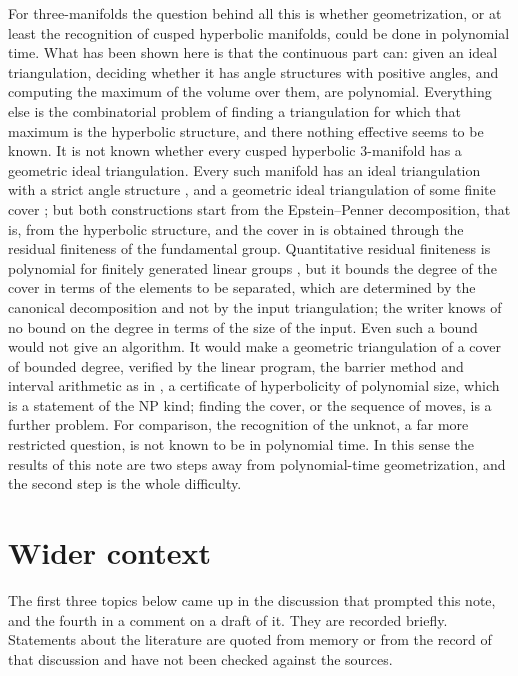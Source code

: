 \documentclass[11pt]{amsart}
\theoremstyle{definition}
\theoremstyle{remark}
\begin{document}
For three-manifolds the question behind all this is whether geometrization, or at least the recognition of cusped hyperbolic manifolds, could be done in polynomial time. What has been shown here is that the continuous part can: given an ideal triangulation, deciding whether it has angle structures with positive angles, and computing the maximum of the volume over them, are polynomial.
Everything else is the combinatorial problem of finding a triangulation for which that maximum is the hyperbolic structure, and there nothing effective seems to be known. It is not known whether every cusped hyperbolic $3$-manifold has a geometric ideal triangulation.
Every such manifold has an ideal triangulation with a strict angle structure \cite{HRS12}, and a geometric ideal triangulation of some finite cover \cite{LST08}; but both constructions start from the Epstein--Penner decomposition, that is, from the hyperbolic structure, and the cover in \cite{LST08} is obtained through the residual finiteness of the fundamental group.
Quantitative residual finiteness is polynomial for finitely generated linear groups \cite{BR10}, but it bounds the degree of the cover in terms of the elements to be separated, which are determined by the canonical decomposition and not by the input triangulation; the writer knows of no bound on the degree in terms of the size of the input.
Even such a bound would not give an algorithm. It would make a geometric triangulation of a cover of bounded degree, verified by the linear program, the barrier method and interval arithmetic as in \cite{HIKMOT16}, a certificate of hyperbolicity of polynomial size, which is a statement of the NP kind; finding the cover, or the sequence of moves, is a further problem.
For comparison, the recognition of the unknot, a far more restricted question, is not known to be in polynomial time. In this sense the results of this note are two steps away from polynomial-time geometrization, and the second step is the whole difficulty.

\section{Wider context}\label{sec:context}
The first three topics below came up in the discussion that prompted this note, and the fourth in a comment on a draft of it. They are recorded briefly. Statements about the literature are quoted from memory or from the record of that discussion and have not been checked against the sources.
\end{document}
